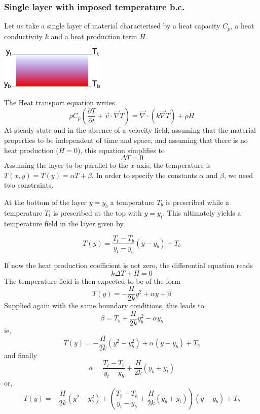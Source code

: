 \subsubsection{Single layer with imposed temperature b.c.}

Let us take a single layer of material characterised by
a heat capacity $C_p$, a heat conductivity $k$
and a heat production term $H$.

\begin{center}
\includegraphics[width=5cm]{images/initial_temperature/tempcond.png}
\end{center}

The Heat transport equation writes
\begin{equation}
\rho C_p \left( \frac{\partial T}{\partial t} + {\vec v} \cdot {\vec \nabla} { T} \right) = 
{\vec \nabla} \cdot (k {\vec \nabla} T) + \rho H
\end{equation}
At steady state and in the absence of a velocity field, assuming
that the material properties to be independent of time and space, and 
assuming that
there is no heat production ($H=0$), this equation
simplifies to
\begin{equation}
\Delta T =0 
\end{equation}
Assuming the layer to be parallel to the $x$-axis, the temperature is
$T(x,y)=T(y)=\alpha T+ \beta$. 
In order to specify the constants $\alpha$ and $\beta$, we need two constraints.

At the bottom of the layer $y=y_b$ a temperature $T_b$ is prescribed while a temperature
$T_t$ is prescribed at the top with $y=y_t$. This ultimately yields a temperature field in
the layer given by
\begin{mdframed}[backgroundcolor=blue!5]
\[
T(y) = \frac{T_t-T_b}{y_t-y_b}(y-y_b) + T_b
\]
\end{mdframed}

If now the heat production coefficient is not zero, the differential equation
reads
\begin{equation}
 k \Delta T + H = 0 
\end{equation}
The temperature field is then expected to be of the form
\begin{equation}
T(y)= - \frac{H}{2k} y^2 + \alpha y + \beta 
\end{equation}
Supplied again with the same boundary conditions, this leads to
\[
\beta=T_b + \frac{H}{2k} y_b^2 - \alpha y_b
\]
ie,
\[
T(y) = -\frac{H}{2k} (y^2-y_b^2) + \alpha (y-y_b) + T_b
\]
and finally
\[
\alpha =  \frac{T_t-T_b}{y_t-y_b}  + \frac{H}{2k}(y_b+y_t)
\]
or,
\[
T(y) = -\frac{H}{2k} (y^2-y_b^2) + \left( \frac{T_t-T_b}{y_t-y_b}  + \frac{H}{2k}(y_b+y_t)   \right) (y-y_b) + T_b
\]


